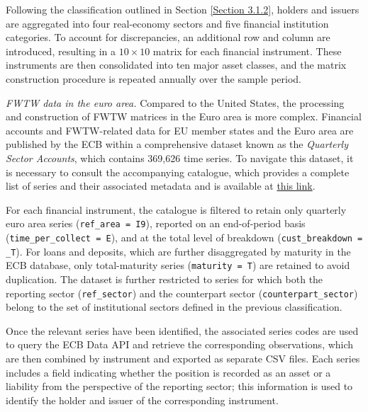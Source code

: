 Following the classification outlined in Section \ref{Section 3.1.2}, holders and issuers are aggregated into four real-economy sectors and five financial institution categories. To account for discrepancies, an additional row and column are introduced, resulting in a $10 \times 10$ matrix for each financial instrument. These instruments are then consolidated into ten major asset classes, and the matrix construction procedure is repeated annually over the sample period.

\textit{FWTW data in the euro area.} Compared to the United States, the processing and construction of FWTW matrices in the Euro area is more complex. Financial accounts and FWTW-related data for EU member states and the Euro area are published by the ECB within a comprehensive dataset known as the \textit{Quarterly Sector Accounts}, which contains 369{,}626 time series. To navigate this dataset, it is necessary to consult the accompanying catalogue, which provides a complete list of series and their associated metadata and is available at \href{https://data.ecb.europa.eu/data/data-categories/2045085/data-information?layerType=KL&showDatasetModal=false}{this link}.

For each financial instrument, the catalogue is filtered to retain only quarterly euro area series (\texttt{ref\_area = I9}), reported on an end-of-period basis (\texttt{time\_per\_collect = E}), and at the total level of breakdown (\texttt{cust\_breakdown = \_T}). For loans and deposits, which are further disaggregated by maturity in the ECB database, only total-maturity series (\texttt{maturity = T}) are retained to avoid duplication. The dataset is further restricted to series for which both the reporting sector (\texttt{ref\_sector}) and the counterpart sector (\texttt{counterpart\_sector}) belong to the set of institutional sectors defined in the previous classification.

Once the relevant series have been identified, the associated series codes are used to query the ECB Data API and retrieve the corresponding observations, which are then combined by instrument and exported as separate CSV files. Each series includes a field indicating whether the position is recorded as an asset or a liability from the perspective of the reporting sector; this information is used to identify the holder and issuer of the corresponding instrument.

